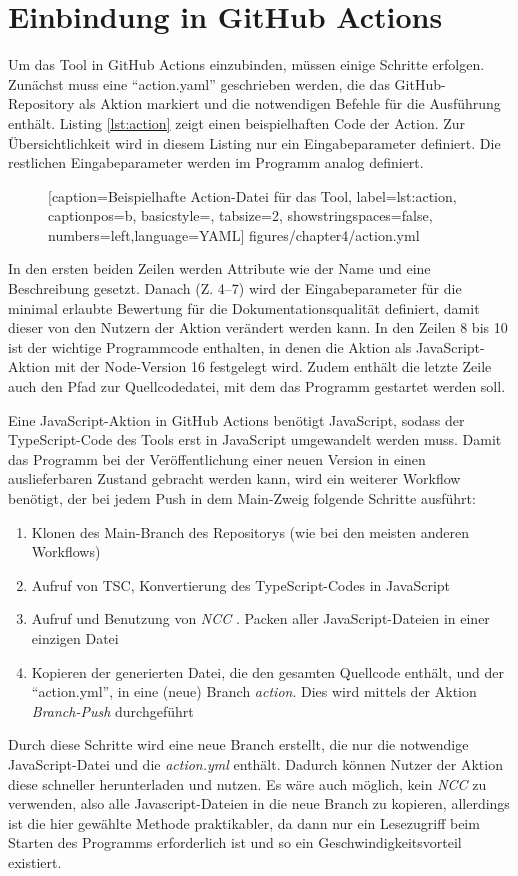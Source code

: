   
\section{Einbindung in GitHub Actions}\label{chapter:github_actions_impl}
Um das Tool in GitHub Actions einzubinden, müssen einige Schritte erfolgen. Zunächst muss eine \enquote{action.yaml} geschrieben werden, die das GitHub-Repository als Aktion markiert und die notwendigen Befehle für die Ausführung enthält. Listing  \ref{lst:action} zeigt einen beispielhaften Code der Action. Zur Übersichtlichkeit wird in diesem Listing nur ein Eingabeparameter definiert. Die restlichen Eingabeparameter werden im Programm analog definiert.
\begin{figure} [htbp]

[caption={Beispielhafte Action-Datei für das Tool},
label={lst:action},
captionpos=b, basicstyle=\footnotesize, tabsize=2, showstringspaces=false,  numbers=left,language=YAML]
{figures/chapter4/action.yml}
\end{figure}

In den ersten beiden Zeilen werden Attribute wie der Name und eine Beschreibung gesetzt. Danach (Z. 4--7) wird der Eingabeparameter für die minimal erlaubte Bewertung für die Dokumentationsqualität definiert, damit dieser von den Nutzern der Aktion verändert werden kann. In den Zeilen 8 bis 10 ist der wichtige Programmcode enthalten, in denen die Aktion als JavaScript-Aktion mit der Node-Version 16 festgelegt wird. Zudem enthält die letzte Zeile auch den Pfad zur Quellcodedatei, mit dem das Programm gestartet werden soll. 

\bigskip
Eine JavaScript-Aktion in GitHub Actions benötigt JavaScript, sodass der TypeScript-Code des Tools erst in JavaScript umgewandelt werden muss. Damit das Programm bei der Veröffentlichung einer neuen Version in einen auslieferbaren Zustand gebracht werden kann, wird ein weiterer Workflow benötigt, der bei jedem Push in dem Main-Zweig folgende Schritte ausführt:
\begin{enumerate}
    \item Klonen des Main-Branch des Repositorys (wie bei den meisten anderen Workflows)
    \item Aufruf von TSC, Konvertierung des TypeScript-Codes in JavaScript
    \item Aufruf und Benutzung von \textit{NCC} \cite{ncc}. Packen aller JavaScript-Dateien in einer einzigen Datei
    \item Kopieren der generierten Datei, die den gesamten Quellcode enthält, und der \enquote{action.yml}, in eine (neue) Branch \textit{action}. Dies wird mittels der Aktion \textit{Branch-Push} \cite{Branch-Push} durchgeführt
\end{enumerate}
Durch diese Schritte wird eine neue Branch erstellt, die nur die notwendige JavaScript-Datei und die \textit{action.yml} enthält. Dadurch können Nutzer der Aktion diese schneller herunterladen und nutzen. Es wäre auch möglich, kein \textit{NCC} zu verwenden, also alle Javascript-Dateien in die neue Branch zu kopieren, allerdings ist die hier gewählte Methode praktikabler, da dann nur ein Lesezugriff beim Starten des Programms erforderlich ist und so ein Geschwindigkeitsvorteil existiert. 

